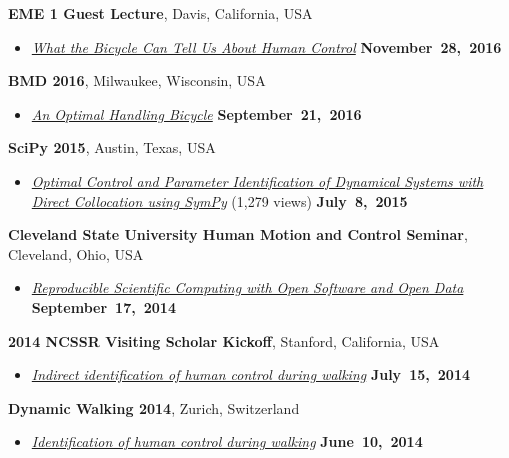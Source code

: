 \documentclass[10pt]{article}
\newenvironment{outerlist}[1][\enskip\textbullet]%
        {\begin{itemize}[#1]}{\end{itemize}%
         \vspace{-.6\baselineskip}}
\newenvironment{innerlist}[1][\enskip\textbullet]%
        {\begin{compactitem}[#1]}{\end{compactitem}}
\newcommand{\blankline}{\quad\pagebreak[2]}
\begin{document}
\begin{innerlist}
\blankline

\textbf{EME 1 Guest Lecture}, Davis, California, USA
\begin{outerlist}
\item[]
  \href{http://www.moorepants.info/presentations/2016/EME001/#/}{\textit{What
    the Bicycle Can Tell Us About Human Control}}
    \hfill \textbf{November~28,~2016}
\end{outerlist}

\blankline

\textbf{BMD 2016}, Milwaukee, Wisconsin, USA
\begin{outerlist}
\item[]
  \href{http://www.moorepants.info/presentations/2016/BMD2016/}{\textit{
    An Optimal Handling Bicycle}}
    \hfill \textbf{September~21,~2016}
\end{outerlist}

\blankline

\textbf{SciPy 2015}, Austin, Texas, USA
\begin{outerlist}
\item[]
  \href{https://youtu.be/ZJiYs2HuQy8}{\textit{
    Optimal Control and Parameter Identification of Dynamical Systems with
Direct Collocation using SymPy}} (1,279 views)
    \hfill \textbf{July~8,~2015}
\end{outerlist}

\blankline

\textbf{Cleveland State University Human Motion and Control Seminar}, Cleveland, Ohio, USA
\begin{outerlist}
\item[]
  \href{http://www.moorepants.info/presentations/2014/csu-fall-hmc-seminar}{\textit{Reproducible
    Scientific Computing with Open Software and Open Data}}
    \hfill \textbf{September~17,~2014}
\end{outerlist}

\blankline

\textbf{2014 NCSSR Visiting Scholar Kickoff}, Stanford, California, USA
\begin{outerlist}
\item[]
  \href{http://www.moorepants.info/presentations/2014/ncssr-kickoff}{\textit{Indirect
      identification of human control during walking}}
    \hfill \textbf{July~15,~2014}
\end{outerlist}

\blankline

\textbf{Dynamic Walking 2014}, Zurich, Switzerland
\begin{outerlist}
\item[]
  \href{http://www.moorepants.info/presentations/2014/DW2014}{\textit{Identification
  of human control during walking}}
    \hfill \textbf{June~10,~2014}
\end{outerlist}


\end{innerlist}
\end{document}
